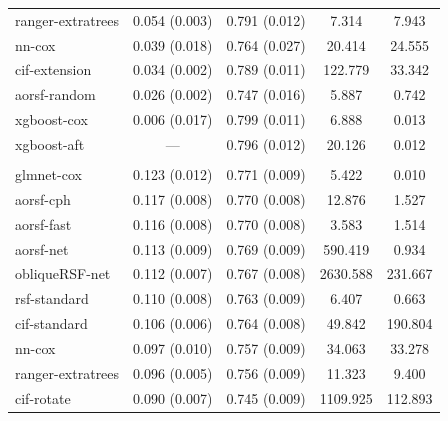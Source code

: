 \documentclass{article}\usepackage[]{graphicx}\usepackage[]{xcolor}
\newenvironment{knitrout}{}{} %
\begin{document}
\begin{knitrout}
\begin{longtable}[t]{lcccc}
\hspace{1em}ranger-extratrees & 0.054 (0.003) & 0.791 (0.012) & 7.314 & 7.943\\
\hspace{1em}nn-cox & 0.039 (0.018) & 0.764 (0.027) & 20.414 & 24.555\\
\hspace{1em}cif-extension & 0.034 (0.002) & 0.789 (0.011) & 122.779 & 33.342\\
\hspace{1em}aorsf-random & 0.026 (0.002) & 0.747 (0.016) & 5.887 & 0.742\\
\hspace{1em}xgboost-cox & 0.006 (0.017) & 0.799 (0.011) & 6.888 & 0.013\\
\hspace{1em}xgboost-aft & --- & 0.796 (0.012) & 20.126 & 0.012\\
\addlinespace[0.3em]
\multicolumn{5}{l}{\textit{\textbf{SPRINT; death, n = 9361, p = 174}}}\\
\hline
\hspace{1em}glmnet-cox & 0.123 (0.012) & 0.771 (0.009) & 5.422 & 0.010\\
\hspace{1em}aorsf-cph & 0.117 (0.008) & 0.770 (0.008) & 12.876 & 1.527\\
\hspace{1em}aorsf-fast & 0.116 (0.008) & 0.770 (0.008) & 3.583 & 1.514\\
\hspace{1em}aorsf-net & 0.113 (0.009) & 0.769 (0.009) & 590.419 & 0.934\\
\hspace{1em}obliqueRSF-net & 0.112 (0.007) & 0.767 (0.008) & 2630.588 & 231.667\\
\hspace{1em}rsf-standard & 0.110 (0.008) & 0.763 (0.009) & 6.407 & 0.663\\
\hspace{1em}cif-standard & 0.106 (0.006) & 0.764 (0.008) & 49.842 & 190.804\\
\hspace{1em}nn-cox & 0.097 (0.010) & 0.757 (0.009) & 34.063 & 33.278\\
\hspace{1em}ranger-extratrees & 0.096 (0.005) & 0.756 (0.009) & 11.323 & 9.400\\
\hspace{1em}cif-rotate & 0.090 (0.007) & 0.745 (0.009) & 1109.925 & 112.893\\

\end{longtable}
\end{knitrout}
\end{document}

